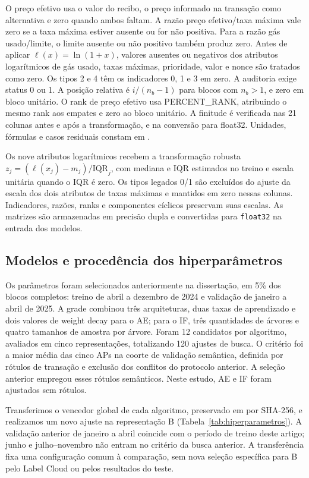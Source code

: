 
O preço efetivo usa o valor do recibo, o preço informado na transação como alternativa e zero quando ambos faltam. A razão preço efetivo/taxa máxima vale zero se a taxa máxima estiver ausente ou for não positiva. Para a razão gás usado/limite, o limite ausente ou não positivo também produz zero. Antes de aplicar $\ell(x)=\ln(1+x)$, valores ausentes ou negativos dos atributos logarítmicos de gás usado, taxas máximas, prioridade, valor e nonce são tratados como zero. Os tipos 2 e 4 têm os indicadores 0, 1 e 3 em zero. A auditoria exige status 0 ou 1. A posição relativa é $i/(n_b-1)$ para blocos com $n_b>1$, e zero em bloco unitário. O rank de preço efetivo usa PERCENT\_RANK, atribuindo o mesmo rank aos empates e zero ao bloco unitário. A finitude é verificada nas 21 colunas antes e após a transformação, e na conversão para float32. Unidades, fórmulas e casos residuais constam em .

Os nove atributos logarítmicos recebem a transformação robusta $z_j=(\ell(x_j)-m_j)/\mathrm{IQR}_j$, com mediana e IQR estimados no treino e escala unitária quando o IQR é zero. Os tipos legados 0/1 são excluídos do ajuste da escala dos dois atributos de taxas máximas e mantidos em zero nessas colunas. Indicadores, razões, ranks e componentes cíclicos preservam suas escalas. As matrizes são armazenadas em precisão dupla e convertidas para \texttt{float32} na entrada dos modelos.

\subsection{Modelos e procedência dos hiperparâmetros}
\label{sec:hiperparametros}
Os parâmetros foram selecionados anteriormente na dissertação, em 5\% dos blocos completos: treino de abril a dezembro de 2024 e validação de janeiro a abril de 2025. A grade combinou três arquiteturas, duas taxas de aprendizado e dois valores de weight decay para o AE; para o IF, três quantidades de árvores e quatro tamanhos de amostra por árvore. Foram 12 candidatos por algoritmo, avaliados em cinco representações, totalizando 120 ajustes de busca. O critério foi a maior média das cinco APs na coorte de validação semântica, definida por rótulos de transação e exclusão dos conflitos do protocolo anterior. A seleção anterior empregou esses rótulos semânticos. Neste estudo, AE e IF foram ajustados sem rótulos.

Transferimos o vencedor global de cada algoritmo, preservado em  por SHA-256, e realizamos um novo ajuste na representação B (Tabela~\ref{tab:hiperparametros}). A validação anterior de janeiro a abril coincide com o período de treino deste artigo; junho e julho--novembro não entram no critério da busca anterior. A transferência fixa uma configuração comum à comparação, sem nova seleção específica para B pelo Label Cloud ou pelos resultados do teste.

